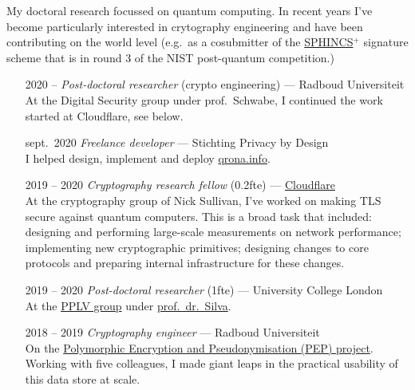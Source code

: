 \documentclass{article}
\newcommand\partitle[1]{\vskip20pt\par\noindent{\textsf{\textbf{#1}}}}
\begin{document}
My doctoral research focussed on quantum computing.
In recent years I've become particularly interested
    in crytography engineering and have been contributing on the world level
        (e.g.~as a cosubmitter of the
	\href{https://sphincs.org/data/sphincs+-round3-specification.pdf}{SPHINCS$^+$}
    signature scheme that is in round 3 of the NIST post-quantum competition.)

\partitle{Career}
\begin{itemize}
    \item[2020 --] \emph{Post-doctoral researcher} (crypto engineering) --- Radboud Universiteit\\
        At the Digital Security group under prof.~Schwabe,
            I continued the work started at Cloudflare, see below.
    \item[sept.~2020] \emph{Freelance developer} --- Stichting Privacy by Design\\
        I helped design, implement and deploy \href{https://qrona.info}{qrona.info}.
    \item[2019 -- 2020] \emph{Cryptography research fellow} (0.2fte) --- 
        \href{https://cloudflare.com}{Cloudflare} \\
        At the cryptography group of Nick Sullivan, I've
            worked on making TLS secure against quantum computers.
        This is a broad task that included:
                designing and performing large-scale measurements on network
                    performance;
                implementing new cryptographic primitives;
                designing changes to core protocols and
                    preparing internal infrastructure for these changes.
    \item[2019 -- 2020] \emph{Post-doctoral researcher} (1fte) --- University
        College London\\
        At the \href{http://pplv.cs.ucl.ac.uk/welcome/}{PPLV group}
            under \href{https://alexandrasilva.org/#/main.html}{prof.~dr.~Silva}.
    \item[2018 -- 2019] \emph{Cryptography engineer} --- Radboud Universiteit\\
        On the \href{https://pep.cs.ru.nl}{Polymorphic Encryption and Pseudonymisation (PEP) project}.
        Working with five colleagues, I made giant leaps in the practical usability
        of this data store at scale.


\end{itemize}
\end{document}

